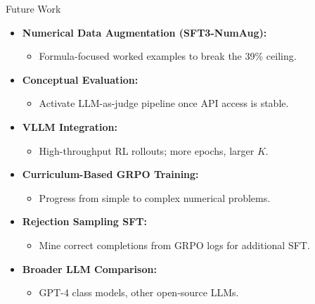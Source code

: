 \documentclass[10pt]{beamer}
\begin{document}
\begin{frame}{Future Work}
\large
\begin{itemize}
    \item<1-> \textbf{Numerical Data Augmentation (SFT3-NumAug):}
    \begin{itemize}
        \item Formula-focused worked examples to break the 39\% ceiling.
    \end{itemize}

    \vspace{0.2cm}

    \item<1-> \textbf{Conceptual Evaluation:}
    \begin{itemize}
        \item Activate LLM-as-judge pipeline once API access is stable.
    \end{itemize}

    \vspace{0.2cm}

    \item<1-> \textbf{VLLM Integration:}
    \begin{itemize}
        \item High-throughput RL rollouts; more epochs, larger $K$.
    \end{itemize}

    \vspace{0.2cm}

    \item<2-> \textbf{Curriculum-Based GRPO Training:}
    \begin{itemize}
        \item Progress from simple to complex numerical problems.
    \end{itemize}

    \vspace{0.2cm}

    \item<2-> \textbf{Rejection Sampling SFT:}
    \begin{itemize}
        \item Mine correct completions from GRPO logs for additional SFT.
    \end{itemize}

    \vspace{0.2cm}

    \item<2-> \textbf{Broader LLM Comparison:}
    \begin{itemize}
        \item GPT-4 class models, other open-source LLMs.
    \end{itemize}
\end{itemize}
\end{frame}
\end{document}
